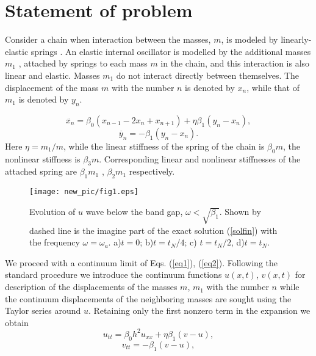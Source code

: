 \section{Statement of  problem}

Consider a  chain   when interaction between the  masses,  $m$,  is modeled by linearly- elastic springs \cite{Huang2010}. An elastic internal oscillator is modelled by the additional masses $m_1$ , attached by springs to each mass $m$ in the chain, and this interaction is also linear and elastic. Masses $m_1$ do not interact directly between themselves. The displacement of the mass $m$ with the number $n$ is denoted by $x_n$, while that of $m_1$ is denoted by $y_n$.

\begin{equation}
\ddot{x_n}=\beta_0 (x_{n-1}-2x_n+x_{n+1})+\eta \beta_1 (y_n-x_n), 
\label{eq1}
\end{equation}
\begin{equation}
\ddot{y_n}=-\beta_1 (y_n-x_n). \label{eq2}
\end{equation}
Here $\eta=m_1/m$, while the linear stiffness of the spring of the chain is $\beta_0 m$,  the nonlinear stiffness is $\beta_3 m$. Corresponding linear and nonlinear stiffnesses of the attached spring are $\beta_1 m_1$ , $\beta_2 m_1$ respectively. 
\begin{figure*}[h]
\begin{center}
\texttt{[image: new\_pic/fig1.eps]}
\end{center}
\caption{ Evolution of $u$ wave below the band gap, $\omega<\sqrt{\beta_1}$. Shown by dashed line is the imagine part of the  exact solution (\ref{solfin}) with the frequency $\omega=\omega_a$.  a)$t=0$; b)$ t=t_N/4$; c) $t=t_N/2$, d)$t=t_N$.}
\label{fg1}
  \end{figure*}
We proceed with a continuum limit of Eqs. (\ref{eq1}), (\ref{eq2}). Following the standard procedure we introduce the continuum functions $u(x,t)$, $v(x,t)$ for description of the displacements of the masses $m$, $m_1$ with the number $n$ while the continuum displacements of the neighboring masses are sought using the Taylor series around $u$. Retaining only the first nonzero term in the expansion we obtain
\begin{equation}
u_{tt}=\beta_0 h^2 u_{xx}+\eta \beta_1 (v-u), \label{eq3}
\end{equation}
\begin{equation}
v_{tt}=-\beta_1 (v-u), \label{eq4}
\end{equation}
